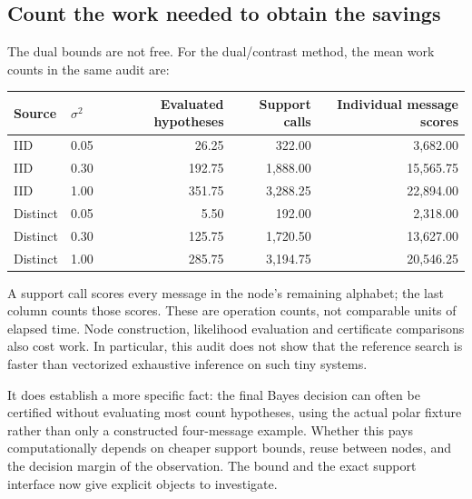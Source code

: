 \documentclass[10pt,a4paper]{article}
\begin{document}
\clearpage
\subsection{Count the work needed to obtain the savings}
The dual bounds are not free. For the dual/contrast method, the mean work counts in the same audit are:
\begin{center}
\begin{tabular}{@{}llrrr@{}}\toprule
Source & $\sigma^2$ & Evaluated hypotheses & Support calls & Individual message scores\\\midrule
IID & 0.05 & 26.25 & 322.00 & 3,682.00\\
IID & 0.30 & 192.75 & 1,888.00 & 15,565.75\\
IID & 1.00 & 351.75 & 3,288.25 & 22,894.00\\
Distinct & 0.05 & 5.50 & 192.00 & 2,318.00\\
Distinct & 0.30 & 125.75 & 1,720.50 & 13,627.00\\
Distinct & 1.00 & 285.75 & 3,194.75 & 20,546.25\\\bottomrule
\end{tabular}
\end{center}
A support call scores every message in the node's remaining alphabet; the last column counts those scores.
These are operation counts, not comparable units of elapsed time. Node construction, likelihood evaluation
and certificate comparisons also cost work. In particular, this audit does not show that the reference search
is faster than vectorized exhaustive inference on such tiny systems.

It does establish a more specific fact: the final Bayes decision can often be certified without evaluating most
count hypotheses, using the actual polar fixture rather than only a constructed four-message example.
Whether this pays computationally depends on cheaper support bounds, reuse between nodes, and the decision
margin of the observation. The bound and the exact support interface now give explicit objects to investigate.
\end{document}
